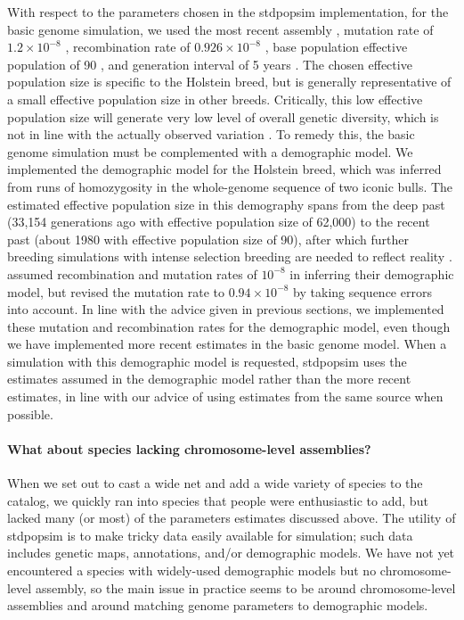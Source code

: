 \documentclass[hidelinks]{article}
\begin{document}
With respect to the parameters chosen in the stdpopsim implementation,
for the basic genome simulation, we used the most recent assembly
\citep{Rosen2020}, mutation rate of \(1.2 \times 10^{-8}\) \citep{Harland2017},
recombination rate of \(0.926 \times 10^{-8}\) \citep{Ma2015}, base population
effective population of 90 \citep{MacLeod2013}, and generation interval of 5
years \citep{MacLeod2013}. The chosen effective population size is specific
to the Holstein breed, but is generally representative of a small
effective population size in other breeds. Critically, this low
effective population size will generate very low level of overall
genetic diversity, which is not in line with the actually observed
variation \citep[e.g.,][]{Rosen2020}. To remedy this, the basic genome
simulation must be complemented with a demographic model. We implemented
the \cite{MacLeod2013} demographic model for the Holstein breed, which was
inferred from runs of homozygosity in the whole-genome sequence of two
iconic bulls. The estimated effective population size in this demography
spans from the deep past (33,154 generations ago with effective population size
of 62,000) to the recent past (about 1980 with effective population size of 90),
after which further breeding simulations with intense selection breeding are
needed to reflect reality \citep[e.g.,][]{
MacLeod2014, Gaynor2020, Obsteter2021}. \cite{MacLeod2013} assumed
recombination and mutation rates of \(10^{-8}\) in inferring their
demographic model, but revised the mutation rate to \(0.94 \times 10^{-8}\) by
taking sequence errors into account. In line with the advice given in
previous sections, we implemented these mutation and recombination rates
for the \cite{MacLeod2013} demographic model, even though we have implemented
more recent estimates in the basic genome model. 
When a simulation with this demographic model is requested, stdpopsim uses the
estimates assumed in the demographic model rather than the more
recent estimates, in line with our advice of using estimates from the same
source when possible.

\hypertarget{what-about-species-lacking-chromosome-level-assemblies}{%
\paragraph{What about species lacking chromosome-level
assemblies?}\label{what-about-species-lacking-chromosome-level-assemblies}}

When we set out to cast a wide net and add a wide variety of species to
the catalog, we quickly ran into species that people were enthusiastic
to add, but lacked many (or most) of the parameters estimates discussed above. The
utility of stdpopsim is to make tricky data easily available for
simulation; such data includes genetic maps, annotations, and/or
demographic models. We have not yet encountered a species with
widely-used demographic models but no chromosome-level assembly, so the
main issue in practice seems to be around chromosome-level assemblies
and around matching genome parameters to demographic models.
\end{document}
